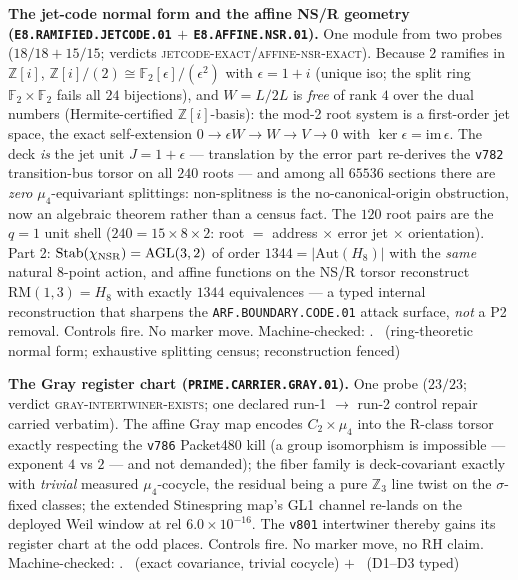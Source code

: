 \documentclass[11pt,a4paper]{article}
\newcommand{\Z}{\mathbb{Z}}
\theoremstyle{definition}
\begin{document}
\par\smallskip\noindent\textbf{The jet-code normal form and the
affine NS/R geometry (\texttt{E8.RAMIFIED.JETCODE.01} $+$
\texttt{E8.AFFINE.NSR.01}).}
One module from two probes ($18/18+15/15$; verdicts
\textsc{jetcode-exact}/\textsc{affine-nsr-exact}).  Because $2$
ramifies in $\Z[i]$, $\Z[i]/(2)\cong\mathbb F_2[\epsilon]/(\epsilon^2)$
with $\epsilon=1{+}i$ (unique iso; the split ring
$\mathbb F_2\times\mathbb F_2$ fails all $24$ bijections), and
$W=L/2L$ is \emph{free} of rank $4$ over the dual numbers
(Hermite-certified $\Z[i]$-basis): the mod-2 root system is a
first-order jet space, the exact self-extension
$0\to\epsilon W\to W\to V\to0$ with
$\ker\epsilon=\mathrm{im}\,\epsilon$.  The deck \emph{is} the jet
unit $J=1{+}\epsilon$ --- translation by the error part re-derives
the \texttt{v782} transition-bus torsor on all $240$ roots --- and
among all $65536$ sections there are \emph{zero} $\mu_4$-equivariant
splittings: non-splitness is the no-canonical-origin obstruction,
now an algebraic theorem rather than a census fact.  The $120$ root
pairs are the $q{=}1$ unit shell ($240=15\times8\times2$: root $=$
address $\times$ error jet $\times$ orientation).  Part 2:
$\mathrm{Stab}(\chi_{\rm NSR})=\mathrm{AGL}(3,2)$ of order
$1344=|\mathrm{Aut}(H_8)|$ with the \emph{same} natural 8-point action, and
affine functions on the NS/R torsor reconstruct
$\mathrm{RM}(1,3)=H_8$ with exactly $1344$ equivalences --- a typed
internal reconstruction that sharpens the
\texttt{ARF.BOUNDARY.CODE.01} attack surface, \emph{not} a P2
removal.  Controls fire.  No marker move.
Machine-checked: .
\mE\ (ring-theoretic normal form; exhaustive splitting census;
reconstruction fenced)
\par\smallskip

\par\smallskip\noindent\textbf{The Gray register chart
(\texttt{PRIME.CARRIER.GRAY.01}).}
One probe ($23/23$; verdict \textsc{gray-intertwiner-exists}; one
declared run-1 $\to$ run-2 control repair carried verbatim).  The
affine Gray map encodes $C_2\times\mu_4$ into the R-class torsor
exactly respecting the \texttt{v786} Packet480 kill (a group
isomorphism is impossible --- exponent $4$ vs $2$ --- and not
demanded); the fiber family is deck-covariant exactly with
\emph{trivial} measured $\mu_4$-cocycle, the residual being a pure
$\Z_3$ line twist on the $\sigma$-fixed classes; the extended
Stinespring map's GL1 channel re-lands on the deployed Weil window
at rel $6.0\times10^{-16}$.  The \texttt{v801} intertwiner thereby
gains its register chart at the odd places.  Controls fire.  No
marker move, no RH claim.
Machine-checked: .
\mE\ (exact covariance, trivial cocycle) $+$ \mO\ (D1--D3 typed)
\par\smallskip
\end{document}
